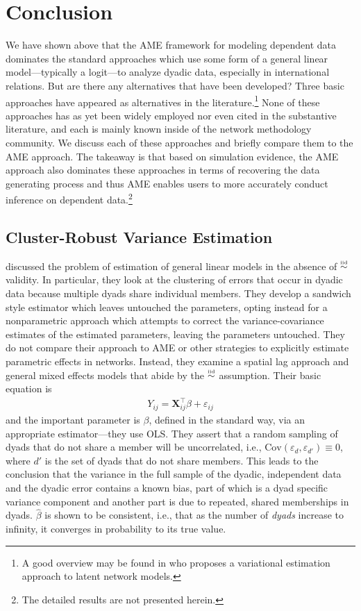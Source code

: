 \section{\textbf{Conclusion}}

We have shown above that the AME framework for modeling dependent data dominates the standard approaches which use some form of a general linear model---typically a logit---to analyze dyadic data, especially in international relations. But are there any alternatives that have been developed? Three basic approaches have appeared as alternatives in the literature.\footnote{A good overview may be found in \cite{stewart:2014} who proposes a variational estimation approach to latent network models.}
None of these approaches has as yet been widely employed nor even cited in the substantive literature, and each is mainly known inside of the network methodology community.  We discuss each of these approaches and briefly compare them to the AME approach. The takeaway is that based on simulation evidence, the AME approach also dominates these approaches in terms of recovering the data generating process and thus AME enables users to more accurately conduct inference on dependent data.\footnote{The detailed results are not presented herein.}


\subsection*{Cluster-Robust Variance Estimation}

\cite{aronow:etal:2015} discussed the problem of estimation of general linear models in the absence of $\simiid$ validity. In particular, they look at the clustering of errors that occur in dyadic data because multiple dyads share individual members. They develop a sandwich style estimator which leaves untouched the parameters, opting instead for a nonparametric approach which attempts to correct the variance-covariance estimates of the estimated parameters, leaving the parameters untouched.  They do not compare their approach to AME or other strategies to explicitly estimate parametric effects in networks. Instead, they examine a spatial lag approach and general mixed effects models that abide by the $\simiid$ assumption.  Their basic equation is 
\begin{eqnarray*}
Y_{ij} = \mathbf{X}_{ij}^\intercal \beta + \varepsilon_{ij}
\end{eqnarray*}
and the important parameter is $\beta$, defined in the standard way, via an appropriate estimator---they use OLS.  They assert that a random sampling of dyads that do not share a member will be uncorrelated, i.e., $\text{Cov}(\varepsilon_d,\varepsilon_{d'}) \equiv 0$, where $d'$ is the set of dyads that do not share members. This leads to the conclusion that the variance in the full sample of the dyadic, independent data and the dyadic error contains a known bias, part of which is a dyad specific variance component and another part is due to repeated, shared memberships in dyads. $\hat{\beta}$ is shown to be consistent, i.e., that as the number of \emph{dyads} increase to infinity, it converges in probability to its true value. 


